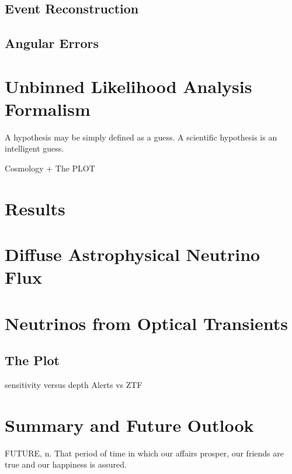 \subsection{Event Reconstruction}
\subsection{Angular Errors}
\section{Unbinned Likelihood Analysis Formalism}
\begin{fquote} A hypothesis may be simply defined as a guess. A scientific hypothesis is an intelligent guess. 
\end{fquote}

Cosmology + The PLOT

\section{Results}
\section{Diffuse Astrophysical Neutrino Flux}

\section{Neutrinos from Optical Transients}
\subsection{The Plot}
sensitivity versus depth
Alerts vs ZTF

\section{Summary and Future Outlook}
\begin{fquote} FUTURE, n. That period of time in which our affairs prosper, our friends are true and our happiness is assured.  
\end{fquote}